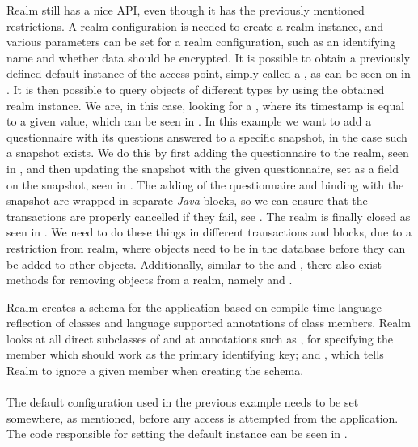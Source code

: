 Realm still has a nice API, even though it has the previously mentioned restrictions. A realm configuration is needed to create a realm instance, and various parameters can be set for a realm configuration, such as an identifying name and whether data should be encrypted. It is possible to obtain a previously defined default instance of the access point, simply called a , as can be seen on  in . It is then possible to query objects of different types by using the obtained realm instance. We are, in this case, looking for a , where its timestamp is equal to a given value, which can be seen in . In this example we want to add a questionnaire with its questions answered to a specific snapshot, in the case such a snapshot exists. We do this by first adding the questionnaire to the realm, seen in , and then updating the snapshot with the given questionnaire, set as a field on the snapshot, seen in . The adding of the questionnaire and binding with the snapshot are wrapped in separate \emph{Java}  blocks, so we can ensure that the transactions are properly cancelled if they fail, see . The realm is finally closed as seen in . We need to do these things in different transactions and  blocks, due to a restriction from realm, where objects need to be in the database before they can be added to other objects. Additionally, similar to the  and , there also exist methods for removing objects from a realm, namely  and .
\\

\FloatBarrier

Realm creates a schema for the application based on compile time language reflection of classes and language supported annotations of class members. Realm looks at all direct subclasses of  and at annotations such as , for specifying the member which should work as the primary identifying key; and , which tells Realm to ignore a given member when creating the schema.
\\\\
The default configuration used in the previous example needs to be set somewhere, as mentioned, before any access is attempted from the application. The code responsible for setting the default instance can be seen in . 

